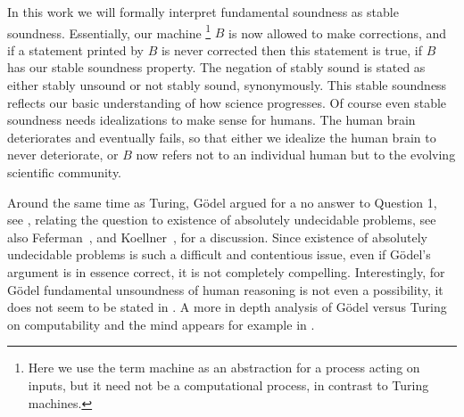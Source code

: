 \documentclass{amsart}  %
\numberwithin{equation}{section}
\theoremstyle{definition}
\theoremstyle{remark}
\begin{document}
{In this work we will formally interpret fundamental soundness as stable soundness. 
Essentially, our machine \footnote {Here we use the term machine as an abstraction for a process acting on inputs, but it need not be a  computational process, in contrast to Turing machines.} $B$ is now allowed to make corrections, and if a statement printed by $B$ is never corrected then this statement is true, if $B$ has our stable soundness property. The negation of stably sound is stated as either stably unsound or not stably sound, synonymously. This stable soundness reflects our basic understanding of how science progresses. Of course even stable soundness needs idealizations to make sense for humans. The human brain deteriorates and eventually fails, so that either we idealize the human brain to never deteriorate, or $B$ now refers not to an individual human but to the evolving scientific community.  

Around the same time as Turing, G\"odel argued for a no answer to Question 1, see \cite[310]{citeGodel}, relating the question to existence of absolutely undecidable problems, see also Feferman~\cite{citeFeferman2006-SFEATA}, and Koellner~\cite{citeKoellner2018-KOEOTQ-3}, \cite{citeKoellnerII2018-KOEOTQ-4} for a discussion.  Since existence of absolutely undecidable problems is such a difficult and contentious issue, even if G\"odel's argument is in essence correct, it is not completely compelling. Interestingly, for G\"odel fundamental unsoundness of human reasoning is not even a possibility, it does not seem to be stated in \cite{citeGodel}.  A more in depth analysis of G\"odel versus Turing on computability and the mind appears for example in \cite{citeCopelandShagrirComputability}.  

}
\end{document}
